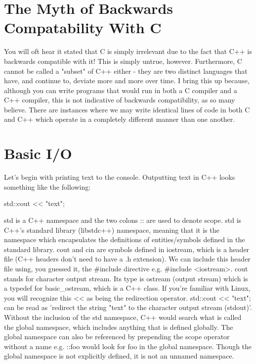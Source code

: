 \documentclass{article}
\begin{document}
\section{The Myth of Backwards Compatability With C}

You will oft hear it stated that C is simply irrelevant due to the fact that C++ is backwards compatible with
it! This is simply untrue, however. Furthermore, C cannot be called a "subset" of C++ either - they are two
distinct languages that have, and continue to, deviate more and more over time. I bring this up because,
although you can write programs that would run in both a C compiler and a C++ compiler, this is not indicative
of backwards compatibility, as so many believe. There are instances where we may write identical lines of code
in both C and C++ which operate in a completely different manner than one another.

\section{Basic I/O}

Let's begin with printing text to the console. Outputting text in C++ looks something like the following:

\begin{cpplst}
std::cout << "text";
\end{cpplst}

std is a C++ namespace and the two colons :: are used to denote scope. std is C++'s standard library
(libstdc++) namespace, meaning that it is the namespace which encapsulates the definitions of entities/symbols
defined in the standard library. cout and cin are symbols defined in iostream, which is a header file (C++
headers don't need to have a .h extension). We can include this header file using, you guessed it, the
\#include directive e.g. \#include <iostream>. cout stands for character output stream. Its type is ostream
(output stream) which is a typedef for basic\_ostream, which is a C++ class. If you’re familiar with Linux,
you will recognize this << as being the redirection operator. std::cout << "text"; can be read as 'redirect
the string "text" to the character output stream (stdout)'. Without the inclusion of the std namespace, C++
would search what is called the global namespace, which includes anything that is defined globally. The global
namespace can also be referenced by prepending the scope operator without a name e.g. ::foo would look for foo
in the global namespace. Though the global namespace is not explicitly defined, it is not an unnamed namespace.
\end{document}
